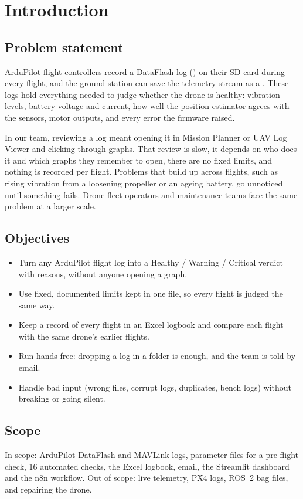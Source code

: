 \documentclass[11pt,a4paper]{article}
\newcommand{\code}[1]{\texttt{\detokenize{#1}}}
\begin{document}
\section{Introduction}

\subsection{Problem statement}
ArduPilot flight controllers record a DataFlash log (\code{.bin}) on their SD card during every flight, and the
ground station can save the telemetry stream as a \code{.tlog}. These logs hold everything needed to judge
whether the drone is healthy: vibration levels, battery voltage and current, how well the position estimator
agrees with the sensors, motor outputs, and every error the firmware raised.

In our team, reviewing a log meant opening it in Mission Planner or UAV Log Viewer and clicking through graphs.
That review is slow, it depends on who does it and which graphs they remember to open, there are no fixed
limits, and nothing is recorded per flight. Problems that build up across flights, such as rising vibration
from a loosening propeller or an ageing battery, go unnoticed until something fails. Drone fleet operators
and maintenance teams face the same problem at a larger scale.

\subsection{Objectives}
\begin{itemize}
  \item Turn any ArduPilot flight log into a Healthy / Warning / Critical verdict with reasons, without anyone
        opening a graph.
  \item Use fixed, documented limits kept in one file, so every flight is judged the same way.
  \item Keep a record of every flight in an Excel logbook and compare each flight with the same drone's earlier
        flights.
  \item Run hands-free: dropping a log in a folder is enough, and the team is told by email.
  \item Handle bad input (wrong files, corrupt logs, duplicates, bench logs) without breaking or going silent.
\end{itemize}

\subsection{Scope}
In scope: ArduPilot DataFlash \code{.bin} and MAVLink \code{.tlog} logs, parameter files for a pre-flight check,
16 automated checks, the Excel logbook, email, the Streamlit dashboard and the n8n workflow. Out of scope:
live telemetry, PX4 \code{.ulg} logs, ROS~2 bag files, and repairing the drone.
\end{document}
